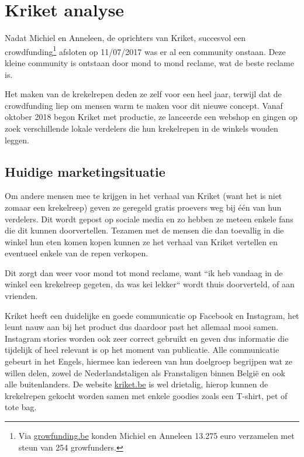 
\chapter{Kriket analyse}
\label{ch:analyse}

Nadat Michiel en Anneleen, de oprichters van Kriket, succesvol een crowdfunding\footnote{Via \href{https://www.growfunding.be/nl/bxl/kriket}{growfunding.be} konden Michiel en Anneleen 13.275 euro verzamelen met steun van 254 growfunders.} afsloten op 11/07/2017 was er al een community onstaan. Deze kleine community is ontstaan door mond to mond reclame, wat de beste reclame is.

Het maken van de krekelrepen deden ze zelf voor een heel jaar, terwijl dat de crowdfunding liep om mensen warm te maken voor dit nieuwe concept. Vanaf oktober 2018 begon Kriket met productie, ze lanceerde een webshop en gingen op zoek verschillende lokale verdelers die hun krekelrepen in de winkels wouden leggen. 

\section{Huidige marketingsituatie}
\label{sec:huidige-marketingsituatie}
Om andere mensen mee te krijgen in het verhaal van Kriket (want het is niet zomaar een krekelreep) geven ze geregeld gratis proevers weg bij één van hun verdelers. Dit wordt gepost op sociale media en zo hebben ze meteen enkele fans die dit kunnen doorvertellen. Tezamen met de mensen die dan toevallig in die winkel hun eten komen kopen kunnen ze het verhaal van Kriket vertellen en eventueel enkele van de repen verkopen.

Dit zorgt dan weer voor mond tot mond reclame, want ``ik heb vandaag in de winkel een krekelreep gegeten, da was kei lekker`` wordt thuis doorverteld, of aan vrienden. 

Kriket heeft een duidelijke en goede communicatie op Facebook en Instagram, het leunt nauw aan bij het product dus daardoor past het allemaal mooi samen. Instagram stories worden ook zeer correct gebruikt en geven dus informatie die tijdelijk of heel relevant is op het moment van publicatie. Alle communicatie gebeurt in het Engels, hiermee kan iedereen van hun doelgroep begrijpen wat ze willen delen, zowel de Nederlandstaligen als Franstaligen binnen België en ook alle buitenlanders. De website \href{https://kriket.be}{kriket.be} is wel drietalig, hierop kunnen de krekelrepen gekocht worden samen met enkele goodies zoals een T-shirt, pet of tote bag. 

